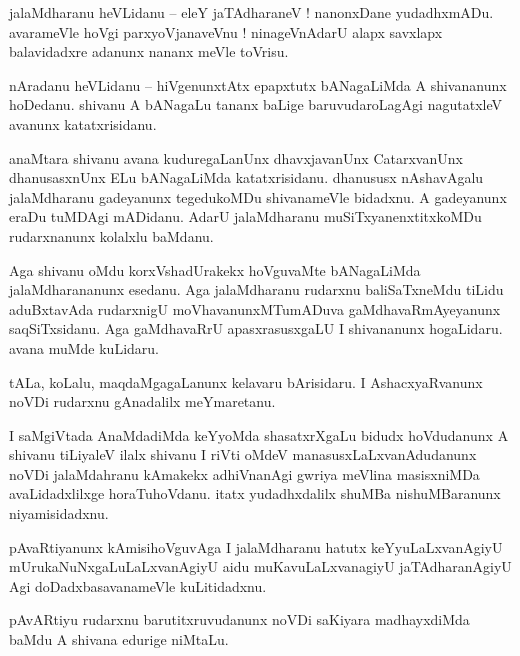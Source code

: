 \documentclass{article}
\begin{document}
\begin{mn}%
jalaMdharanu heVLidanu -- eleY jaTAdharaneV ! nanonxDane yudadhxmADu. avarameVle hoVgi 
parxyoVjanaveVnu ! ninageVnAdarU alapx savxlapx balavidadxre adanunx nananx meVle toVrisu.
\end{mn}

\begin{mn}%
nAradanu heVLidanu -- hiVgenunxtAtx epapxtutx bANagaLiMda A shivananunx hoDedanu. shivanu A 
bANagaLu tananx baLige baruvudaroLagAgi nagutatxleV avanunx katatxrisidanu.
\end{mn}

\begin{mn}%
anaMtara shivanu avana kuduregaLanUnx dhavxjavanUnx CatarxvanUnx dhanusasxnUnx ELu bANagaLiMda 
katatxrisidanu. dhanususx nAshavAgalu jalaMdharanu gadeyanunx tegedukoMDu shivanameVle bidadxnu. A 
gadeyanunx eraDu tuMDAgi mADidanu. AdarU jalaMdharanu muSiTxyanenxtitxkoMDu rudarxnanunx kolalxlu 
baMdanu.
\end{mn}

\begin{mn}%
Aga shivanu oMdu korxVshadUrakekx hoVguvaMte bANagaLiMda jalaMdharananunx esedanu. Aga jalaMdharanu 
rudarxnu baliSaTxneMdu tiLidu aduBxtavAda rudarxnigU moVhavanunxMTumADuva gaMdhavaRmAyeyanunx 
saqSiTxsidanu. Aga gaMdhavaRrU apasxrasusxgaLU I shivananunx hogaLidaru. avana muMde kuLidaru.
\end{mn}

\begin{mn}%
tALa, koLalu, maqdaMgagaLanunx kelavaru bArisidaru. I AshacxyaRvanunx noVDi rudarxnu gAnadalilx 
meYmaretanu.
\end{mn}

\begin{mn}%
I saMgiVtada AnaMdadiMda keYyoMda shasatxrXgaLu bidudx hoVdudanunx A shivanu tiLiyaleV ilalx 
shivanu I riVti oMdeV manasusxLaLxvanAdudanunx noVDi jalaMdahranu kAmakekx adhiVnanAgi gwriya 
meVlina masisxniMDa avaLidadxlilxge horaTuhoVdanu. itatx yudadhxdalilx shuMBa nishuMBaranunx 
niyamisidadxnu.
\end{mn}

\begin{mn}%
pAvaRtiyanunx kAmisihoVguvAga I jalaMdharanu hatutx keYyuLaLxvanAgiyU mUrukaNuNxgaLuLaLxvanAgiyU 
aidu muKavuLaLxvanagiyU jaTAdharanAgiyU Agi doDadxbasavanameVle kuLitidadxnu.
\end{mn}

\begin{mn}%
pAvARtiyu rudarxnu barutitxruvudanunx noVDi saKiyara madhayxdiMda baMdu A shivana edurige niMtaLu.
\end{mn}
\end{document}
